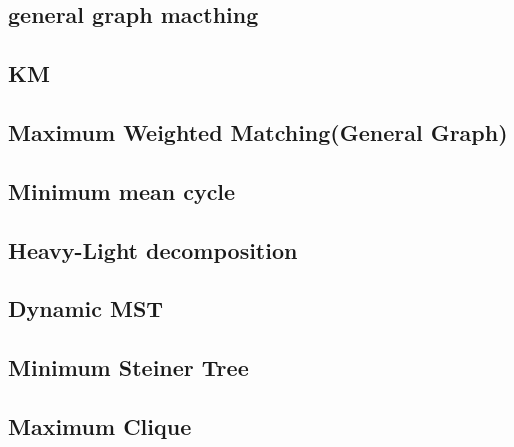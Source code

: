 \documentclass[a4paper,10pt,twocolumn,oneside]{article}
\begin{document}
\subsection{general graph macthing}


%

\subsection{KM}


\subsection{Maximum Weighted Matching(General Graph)}


%

\subsection{Minimum mean cycle}


\subsection{Heavy-Light decomposition}


\subsection{Dynamic MST}


\subsection{Minimum Steiner Tree}


\subsection{Maximum Clique}

\end{document}
